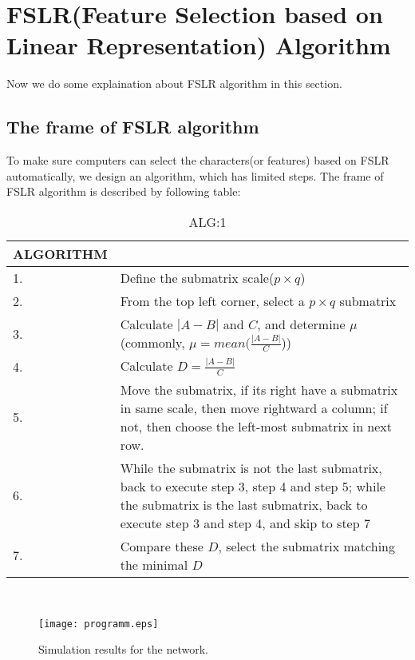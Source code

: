 \documentclass[10pt,journal,final,twocolumn,]{IEEEtran}
\begin{document}
	
	\section{\textbf{FSLR(Feature Selection based on Linear Representation) Algorithm}}
	Now we do some explaination about FSLR algorithm in this section.
	
	\subsection{The frame of FSLR algorithm}
	To make sure computers can select the characters(or features) based on FSLR automatically, we design an algorithm, which has limited steps. The frame of FSLR algorithm is described by following table:
	\begin{table}[h]
		\centering
		\caption{ALG:1}
		\begin{tabular}{l|p{5cm}}
			\hline
			ALGORITHM \\
			\hline
			1.  & Define the submatrix scale($p \times q$) \\
			2.  & From the top left corner, select a $p \times q$ submatrix \\
			3.  & Calculate $|A-B|$ and $C$, and determine $\mu$(commonly, $\mu = mean(\frac{|A-B|}{C}$)) \\
			4.  & Calculate $D=\frac{|A-B|}{C}$ \\
			5.  & Move the submatrix, if its right have a submatrix in same scale, then move rightward a column; if not, then choose the left-most submatrix in next row. \\
			6.  & While the submatrix is not the last submatrix, back to execute step 3, step 4 and step 5; while the submatrix is the last submatrix, back to execute step 3 and step 4, and skip to step 7 \\
			7.  & Compare these $D$, select the submatrix matching the minimal $D$ \\
			\hline  
		\end{tabular}
	\end{table}
	\\{\color{red}{If there shoud be a program chart?}}
	\begin{figure*}[!t]
		\centering
		\texttt{[image: programm.eps]}
		\caption{Simulation results for the network.}
		\label{fig 4}
	\end{figure*}
	
\end{document}
